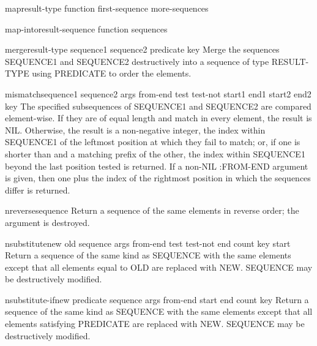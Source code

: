 \begin{function}{map}{result-type function first-sequence \rest more-sequences}{}{}
  
\end{function}

\begin{function}{map-into}{result-sequence function \rest sequences}{}{}
  
\end{function}

\begin{function}{merge}{result-type sequence1 sequence2 predicate \key key}{}{}
  Merge the sequences SEQUENCE1 and SEQUENCE2 destructively into a
   sequence of type RESULT-TYPE using PREDICATE to order the elements.
\end{function}

\begin{function}{mismatch}{sequence1 sequence2 \rest args \key from-end test test-not start1 end1 start2
 end2 key}{}{}
  The specified subsequences of SEQUENCE1 and SEQUENCE2 are compared
   element-wise. If they are of equal length and match in every element, the
   result is NIL. Otherwise, the result is a non-negative integer, the index
   within SEQUENCE1 of the leftmost position at which they fail to match; or,
   if one is shorter than and a matching prefix of the other, the index within
   SEQUENCE1 beyond the last position tested is returned. If a non-NIL
   :FROM-END argument is given, then one plus the index of the rightmost
   position in which the sequences differ is returned.
\end{function}

\begin{function}{nreverse}{sequence}{}{}
  Return a sequence of the same elements in reverse order; the argument
   is destroyed.
\end{function}

\begin{function}{nsubstitute}{new old sequence \rest args \key from-end test test-not end count key start}{}{}
  Return a sequence of the same kind as SEQUENCE with the same elements
  except that all elements equal to OLD are replaced with NEW. SEQUENCE
  may be destructively modified.
\end{function}

\begin{function}{nsubstitute-if}{new predicate sequence \rest args \key from-end start end count key}{}{}
  Return a sequence of the same kind as SEQUENCE with the same elements
   except that all elements satisfying PREDICATE are replaced with NEW.
   SEQUENCE may be destructively modified.
\end{function}

